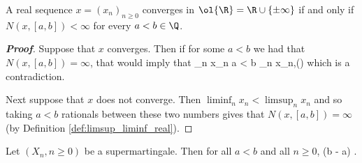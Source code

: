 
\begin{lemma}\label{lem:up_crossing_finite}
A real sequence $x = (x_n)_{n \geq 0}$ converges in $\ol{\R} = \R\cup \{\pm \infty\}$ if and only if $N(x, [a, b]) <\infty$ for every $a < b \in \Q$.
\end{lemma}

\begin{proof}[\bf Proof]
Suppose that $x$ converges. Then if for some $a<b$ we had that $N(x,[a,b]) = \infty$, that would imply that
\be
\liminf_n x_n \leq a < b \leq \limsup_n x_n,\qquad ()
\ee
which is a contradiction.

Next suppose that $x$ does not converge. Then $\liminf_n x_n < \limsup_n x_n$ and so taking $a<b$ rationals between these two numbers gives that $N(x,[a,b]) = \infty$ (by Definition \ref{def:limsup_liminf_real}).
\end{proof}

\begin{lemma}\label{lem:up_crossing_inequality}
Let $(X_n, n \geq 0)$ be a supermartingale. Then for all $a < b$ and all $n \geq 0$,
\be
(b - a)\E{} \leq \E{}.
\ee
\end{lemma}

